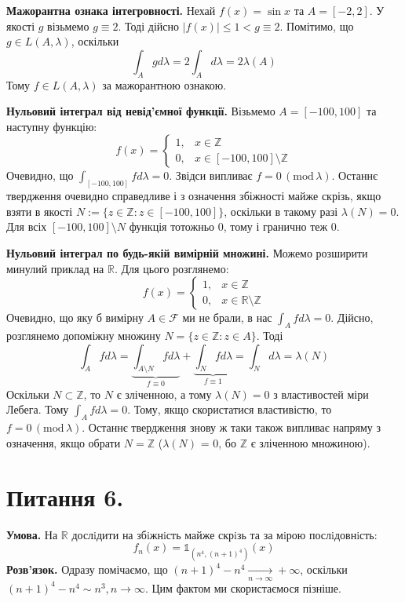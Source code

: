\documentclass[14pt]{extarticle}
\begin{document}
\textbf{Мажорантна ознака інтегровності.} Нехай $f(x) = \sin x$ та $A = [-2, 2]$. У якості $g$ візьмемо $g \equiv 2$. Тоді дійсно $|f(x)| \leq 1 < g \equiv 2$. Помітимо, що $g \in L(A,\lambda)$, оскільки
\[
\int_A gd\lambda = 2\int_A d\lambda = 2\lambda(A)
\]
Тому $f \in L(A,\lambda)$ за мажорантною ознакою.

\textbf{Нульовий інтеграл від невід'ємної функції.} Візьмемо $A=[-100,100]$ та наступну функцію:
\[
f(x) = \begin{cases}
    1, & x \in \mathbb{Z} \\
    0, & x \in [-100,100] \setminus \mathbb{Z}
\end{cases}
\]
Очевидно, що $\int_{[-100,100]}fd\lambda=0$. Звідси випливає $f = 0 \, (\text{mod} \, \lambda)$. Останнє твердження очевидно справедливе і з означення збіжності майже скрізь, якщо взяти в якості $N := \{z \in \mathbb{Z}: z \in [-100, 100]\}$, оскільки в такому разі $\lambda(N) = 0$. Для всіх $[-100,100] \setminus N$ функція тотожньо $0$, тому і гранично теж $0$.

\textbf{Нульовий інтеграл по будь-якій вимірній множині.} Можемо розширити минулий приклад на $\mathbb{R}$. Для цього розглянемо:
\[
f(x) = \begin{cases}
    1, & x \in \mathbb{Z} \\
    0, & x \in \mathbb{R} \setminus \mathbb{Z}
\end{cases}
\]
Очевидно, що яку б вимірну $A \in \mathcal{F}$ ми не брали, в нас $\int_A fd\lambda=0$. Дійсно, розглянемо допоміжну множину $N=\{z \in \mathbb{Z}: z \in A\}$. Тоді
\[
\int_A fd\lambda = \underbrace{\int_{A \setminus N}f d\lambda}_{f \equiv 0} + \underbrace{\int_N fd\lambda}_{f\equiv 1} = \int_N d\lambda = \lambda(N)
\]
Оскільки $N \subset \mathbb{Z}$, то $N$ є зліченною, а тому $\lambda(N) = 0$ з властивостей міри Лебега. Тому $\int_A fd\lambda=0$. Тому, якщо скористатися властивістю, то $f = 0 \, (\text{mod} \, \lambda)$. Останнє твердження знову ж таки також випливає напряму з означення, якщо обрати $N = \mathbb{Z}$ ($\lambda(N)$ = 0, бо $\mathbb{Z}$ є зліченною множиною). 
\pagebreak
\section*{Питання 6.}

\textbf{Умова.} На $\mathbb{R}$ дослiдити на збiжнiсть майже скрiзь та за мiрою послiдовнiсть:
\[
f_n(x) = \mathds{1}_{(n^4,(n+1)^4)}(x)
\]
\textbf{Розв'язок.} Одразу помічаємо, що $(n+1)^4-n^4 \xrightarrow[n \to \infty]{} +\infty$, оскільки $(n+1)^4-n^4 \sim n^3, n \to \infty$. Цим фактом ми скористаємося пізніше. 
\end{document}
